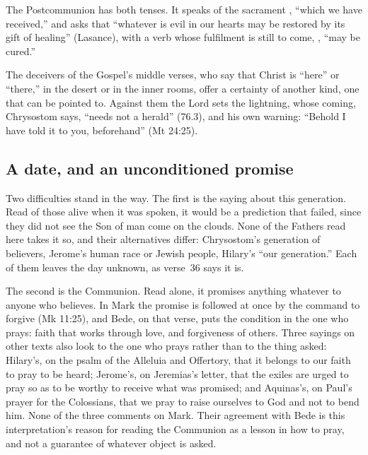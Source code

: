 The Postcommunion has both tenses. It speaks of the sacrament , ``which we have received,'' and asks that ``whatever is evil in
our hearts may be restored by its gift of healing'' (Lasance), with a verb
whose fulfilment is still to come, , ``may be cured.''

The deceivers of the Gospel's middle verses, who say that Christ is ``here''
or ``there,'' in the desert or in the inner rooms, offer a certainty of
another kind, one that can be pointed to. Against them the Lord sets the
lightning, whose coming, Chrysostom says, ``needs not a herald'' (76.3), and
his own warning: ``Behold I have told it to you, beforehand'' (Mt 24:25).

\subsection{A date, and an unconditioned promise}
\label{sec:words-difficulty}

Two difficulties stand in the way. The first is the saying about this
generation. Read of those alive when it was spoken, it would be a prediction
that failed, since they did not see the Son of man come on the clouds. None
of the Fathers read here takes it so, and their alternatives differ:
Chrysostom's generation of believers, Jerome's human race or Jewish people,
Hilary's ``our generation.'' Each of them leaves the day unknown, as
verse~36 says it is.

The second is the Communion. Read alone, it promises anything whatever to
anyone who believes. In Mark the promise is followed at once by the command to
forgive (Mk 11:25), and Bede, on that verse, puts the condition in the one who
prays: faith that works through love, and forgiveness of others. Three
sayings on other texts also look to the one who prays rather than to the thing
asked: Hilary's, on the psalm of the Alleluia and Offertory, that it belongs
to our faith to pray to be heard; Jerome's, on Jeremias's letter, that the
exiles are urged to pray so as to be worthy to receive what was promised; and
Aquinas's, on Paul's prayer for the Colossians, that we pray to raise
ourselves to God and not to bend him. None of the three comments on Mark.
Their agreement with Bede is this interpretation's reason for reading the
Communion as a lesson in how to pray, and not a guarantee of whatever object
is asked.

